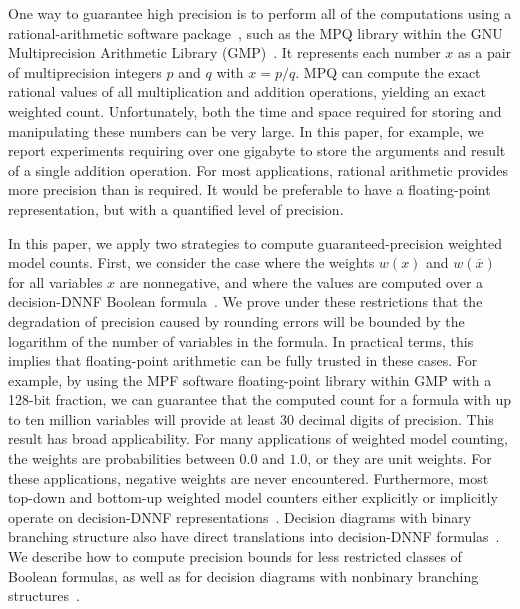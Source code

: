 \documentclass[letterpaper,USenglish,cleveref, autoref, thm-restate]{lipics-v2021}
\newcommand{\obar}[1]{\overline{#1}}
\begin{document}
One way to guarantee high precision is to perform all of the
computations using a rational-arithmetic software package~\cite{knuth:rational:1981}, such as the
MPQ library within the GNU Multiprecision Arithmetic
Library (GMP)~\cite{granlund:gmp:2015}.  It represents each number $x$ as a
pair of multiprecision integers $p$ and $q$ with $x = p/q$.
MPQ
can compute the exact rational values of all multiplication and
addition operations, yielding an exact weighted count.  Unfortunately,
both the time and space required for storing and manipulating these numbers can be very
large.
In this paper, for example, we report experiments requiring over one gigabyte
to store the arguments and result of a single addition operation.
For most applications, rational arithmetic provides more precision than is required.
It would be preferable to have a floating-point
representation, but with a quantified level of precision.

In this paper, we apply two strategies to compute 
guaranteed-precision weighted model counts.  First, we consider the
case where the weights $w(x)$ and $w(\obar{x})$ for all variables $x$ are nonnegative, and
where the values are computed over a decision-DNNF Boolean
formula~\cite{beame:uai:2013,huang:jair:2007}.
We prove under these restrictions
that the degradation of
precision caused by rounding errors will be bounded by the logarithm
of the number of variables in the formula.  In practical terms, this
implies that floating-point arithmetic can be fully trusted in these
cases.  For example, by using the MPF software floating-point library
within GMP with a 128-bit fraction, we can guarantee that the computed
count for a formula with up to ten million variables will provide at least
30 decimal digits of precision.
This result has broad applicability.
For many applications
of weighted model counting, the weights are probabilities between
$0.0$ and $1.0$, or they are unit weights.  For these applications,  negative weights are never encountered.
Furthermore, most top-down and bottom-up weighted model
counters either explicitly or implicitly operate on decision-DNNF
representations~\cite{beame:uai:2013}.  
Decision diagrams with binary branching structure
also have direct translations into decision-DNNF formulas~\cite{huang:jair:2007,oztok:cp:2014}.
We describe how to
compute precision bounds for less restricted classes of Boolean formulas,
as well as for decision diagrams with nonbinary branching structures~\cite{darwiche:ijcai:2011,srinivasan:iccad:1990}.
\end{document}
